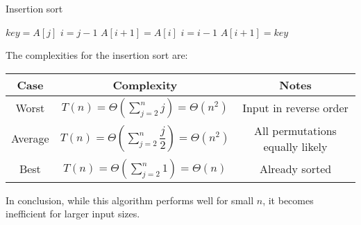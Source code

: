 \begin{algorithm}[H]
    \caption{Insertion sort}
        \begin{algorithmic}[1]
                \State $key = A[j]$
                \State $i = j-1$
                    \State $A[i+1] = A[i]$
                    \State $i = i - 1$
                \EndWhile
                \State $A[i+1] = key$
            \EndFor
        \end{algorithmic}
\end{algorithm}
The complexities for the insertion sort are: 
\renewcommand*{\arraystretch}{2}
\begin{table}[H]
    \centering
    \begin{tabular}{|c|c|c|}
    \hline
    \textbf{Case} & \textbf{Complexity}                                            & \textbf{Notes}                  \\ \hline
    Worst         & $T(n)=\Theta\left(\sum_{j=2}^nj\right)=\Theta(n^2)$                       & Input in reverse order          \\
    Average       & $T(n)=\Theta\left(\sum_{j=2}^n\dfrac{j}{2}\right)=\Theta(n^2)$ & All permutations equally likely \\
    Best          & $T(n)=\Theta\left(\sum_{j=2}^n1\right)=\Theta(n)$              & Already sorted                  \\ \hline
    \end{tabular}
\end{table}
\renewcommand*{\arraystretch}{1}
In conclusion, while this algorithm performs well for small $n$, it becomes inefficient for larger input sizes.

